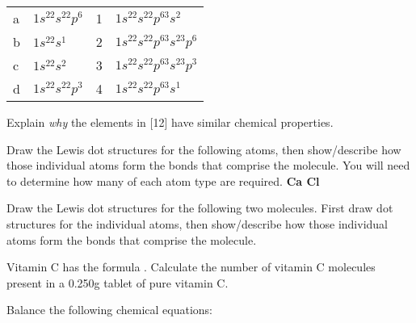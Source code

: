 \documentclass[addpoints, 12pt]{exam}
\begin{document}
\begin{questions}
\begin{tabular}{|l|l|l|l|}
a& $1s^22s^22p^6$ & 1& $1s^22s^22p^63s^2$ \\
b& $1s^22s^1$ & 2& $1s^22s^22p^63s^23p^6$ \\
c& $1s^22s^2$ & 3& $1s^22s^22p^63s^23p^3$ \\
d& $1s^22s^22p^3$ & 4&$1s^22s^22p^63s^1$  
\end{tabular}

\question[5]  Explain \emph{why} the elements in [12] have similar
chemical properties.

\vspace{2cm}

\question[10] Draw the Lewis dot structures for the following atoms, then
show/describe how those individual atoms form the bonds that comprise
the molecule.  You will need to determine how many of each atom type
are required.
\textbf{Ca  Cl}
\vspace{1cm}

\question[10] Draw the Lewis dot structures for the following two
molecules.  First draw dot structures for the individual atoms, then
show/describe how those individual atoms form the bonds that comprise
the molecule.


\question[10] Vitamin C has the formula . Calculate the number
of vitamin C molecules present in a 0.250g tablet of pure vitamin C.
\vspace{3cm}

\question[20] Balance the following chemical equations: 



\end{questions}
\end{document}
